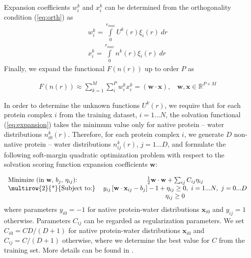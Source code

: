 Expansion coefficients $w_i^{k}$ and $x_i^{k}$ can be determined from the orthogonality condition (\ref{eq:orth}) as 
\begin{eqnarray}
w_i^{k} = \int \limits_{0}^{r_{max}}U^{k}(r) \xi_i (r)~dr \\
x_i^{k} = \int \limits_{0}^{r_{max}}n^{k}(r) \xi_i (r)~dr
\label{eq:projection}
\end{eqnarray}
Finally, 
we expand the functional $F(n(r))$ up 
to order $P$  as

\begin{eqnarray}
\label{eq:expansion}
F(n(r)) \approx \sum_{k=1}^M \sum_{i}^{P} w_{i}^{k}x_{i}^{k} = (\mathbf{w} \cdot \mathbf{x}),~~~~\mathbf{w}, \mathbf{x} \in \mathbb{R}^{P \times M}
\end{eqnarray}

In order to determine the unknown functions  $U^{k}(r)$, we require that for each protein complex $i$ from the training dataset,  $i=1...N$, the solvation functional 
(\ref{eq:expansion}) takes the minimum value only for native protein -- water distributions $n^{k}_{i0}(r)$. Therefore, for each protein complex $i$, we generate $D$ 
non-native protein -- water distributions $n^{k}_{ij}(r)$, $j=1...D$,
and
formulate the following  soft-margin quadratic optimization problem with respect to the solvation scoring function expansion coefficients $\mathbf{w}$:

\begin{eqnarray}
\begin{tabular}{lc}
Minimize (in  $\mathbf{w}$, $b_j$, $\eta_{ij}$):& $\frac{1}{2} \mathbf{w}\cdot\mathbf{w}+ \sum_{ij}C_{ij}\eta_{ij}$ \\ 
\multirow{2}{*}{Subject to:}
&$y_{ij} \left[ \mathbf{w}\cdot \mathbf{x}_{ij}-b_j \right]-1 +\eta_{ij} \geq 0, ~ i=1...N,~j=0...D$ \\
&$\eta_{ij} \geq 0$
\end{tabular}
\label{eq:svmSoftMargin}
\end{eqnarray}
%
where parameters $y_{i0} = -1$ for native protein-water distributions $\mathbf{x}_{i0}$ and $y_{ij} = 1$ otherwise. 
Parameters $C_{ij}$ can be regarded as regularization parameters.  We set $C_{i0} = C D/(D+1)$ for native protein-water distributions $\mathbf{x}_{i0}$ 
and $C_{ij} = C/(D+1)$ otherwise, where we determine the best value for $C$  from the training set. More details can be found in \cite{Derevyanko4}.
